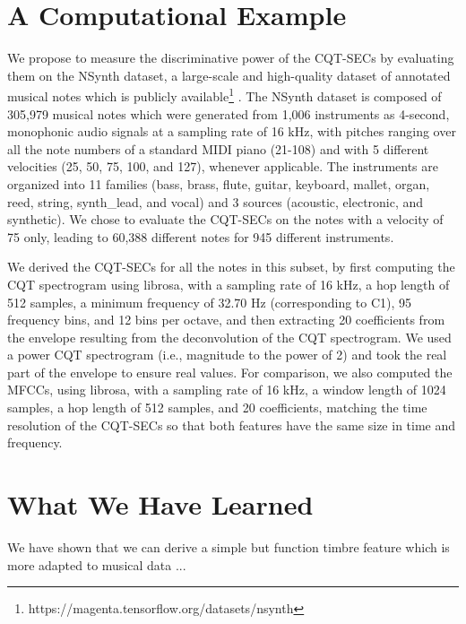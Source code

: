 \documentclass[journal]{IEEEtran}
\begin{document}
\section{A Computational Example}

We propose to measure the discriminative power of the CQT-SECs by evaluating them on the NSynth dataset, a large-scale and high-quality dataset of annotated musical notes which is publicly available\footnote{https://magenta.tensorflow.org/datasets/nsynth} \cite{engel2017}. The NSynth dataset is composed of 305,979 musical notes which were generated from 1,006 instruments as 4-second, monophonic audio signals at a sampling rate of 16 kHz, with pitches ranging over all the note numbers of a standard MIDI piano (21-108) and with 5 different velocities (25, 50, 75, 100, and 127), whenever applicable. The instruments are organized into 11 families (bass, brass, flute, guitar, keyboard, mallet, organ, reed, string, synth\_lead, and vocal) and 3 sources (acoustic, electronic, and synthetic). We chose to evaluate the CQT-SECs on the notes with a velocity of 75 only, leading to 60,388 different notes for 945 different instruments.

We derived the CQT-SECs for all the notes in this subset, by first computing the CQT spectrogram using librosa, with a sampling rate of 16 kHz, a hop length of 512 samples, a minimum frequency of 32.70 Hz (corresponding to C1), 95 frequency bins, and 12 bins per octave, and then extracting 20 coefficients from the envelope resulting from the deconvolution of the CQT spectrogram. We used a power CQT spectrogram (i.e., magnitude to the power of 2) and took the real part of the envelope to ensure real values. For comparison, we also computed the MFCCs, using librosa, with a sampling rate of 16 kHz, a window length of 1024 samples, a hop length of 512 samples, and 20 coefficients, matching the time resolution of the CQT-SECs so that both features have the same size in time and frequency. 



\section{What We Have Learned}

We have shown that we can derive a simple but function timbre feature which is more adapted to musical data ...

\end{document}
